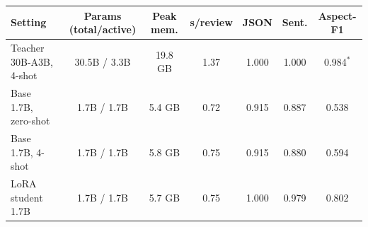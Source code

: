 \begin{tabular}{lcccccc}
\toprule
Setting & Params (total/active) & Peak mem. & s/review & JSON & Sent. & Aspect-F1 \\
\midrule
Teacher 30B-A3B, 4-shot & 30.5B / 3.3B & 19.8 GB & 1.37 & 1.000 & 1.000 & 0.984$^*$ \\
Base 1.7B, zero-shot & 1.7B / 1.7B & 5.4 GB & 0.72 & 0.915 & 0.887 & 0.538 \\
Base 1.7B, 4-shot & 1.7B / 1.7B & 5.8 GB & 0.75 & 0.915 & 0.880 & 0.594 \\
LoRA student 1.7B & 1.7B / 1.7B & 5.7 GB & 0.75 & 1.000 & 0.979 & 0.802 \\
\bottomrule
\end{tabular}
